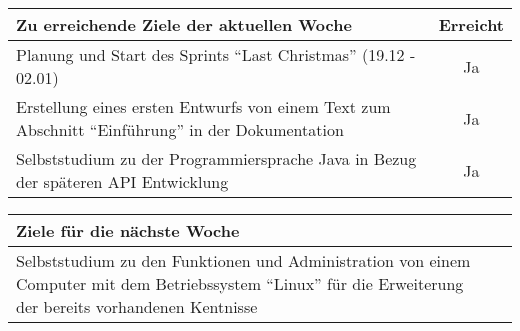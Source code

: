 \begin{tabularx}{\textwidth}{Xc}
    \arrayrulecolor{OliveGreen}
    \toprule
    {\bfseries Zu erreichende Ziele der aktuellen Woche} & {\bfseries Erreicht} \\
    \midrule[2pt]
    Planung und Start des Sprints ``Last Christmas'' (19.12 - 02.01)  &  Ja  \\
    \rowcolor{OliveGreen!15}
    Erstellung eines ersten Entwurfs von einem Text zum Abschnitt
    ``Einführung'' in der Dokumentation  &  Ja  \\
    \rowcolor{White}
    Selbststudium zu der Programmiersprache Java in Bezug der späteren API
    Entwicklung  &  Ja  \\
    \bottomrule[2pt]
\end{tabularx}
%
\vspace{1cm}
%
\begin{tabularx}{\textwidth}{Xc}
    \arrayrulecolor{OliveGreen}
    \toprule
    {\bfseries Ziele für die nächste Woche}              &                   \\
    \midrule[2pt]
    Selbststudium zu den Funktionen und Administration von einem Computer
    mit dem Betriebssystem ``Linux'' für die Erweiterung der bereits
    vorhandenen Kentnisse  &  \\
\end{tabularx}
